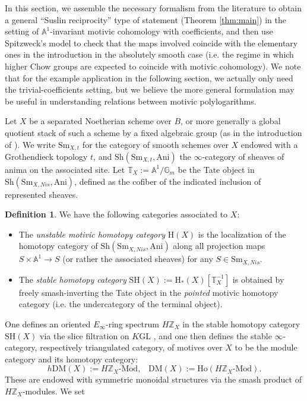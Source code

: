 \documentclass[a4paper,reqno,11pt]{amsart}
\theoremstyle{plain}
\theoremstyle{definition}
\newtheorem{definition}[theorem]{Definition}
\theoremstyle{remark}
\newcommand{\Sh}{{\mathrm{Sh}}}
\newcommand{\Sm}{{\mathrm{Sm}}}
\renewcommand{\H}{{\mathrm{H}}}
\newcommand{\Z}{\mathbb{Z}}
\newcommand{\A}{\mathbb{A}}
\newcommand{\G}{\mathbb{G}}
\newcommand{\T}{\mathbb{T}}
\newcommand{\DM}{\mathrm{DM}}
\newcommand{\SH}{\mathrm{SH}}
\newcommand{\GL}{\mathrm{GL}}
\begin{document}
In this section, we assemble the necessary formalism from the literature to obtain a general ``Suslin reciprocity'' type of statement (Theorem \ref{thm:main}) in the setting of $\A^1$-invariant motivic cohomology with coefficients, and then use Spitzweck's model to check that the maps involved coincide with the elementary ones in the introduction in the absolutely smooth case (i.e. the regime in which higher Chow groups are expected to coincide with motivic cohomology). We note that for the example application in the following section, we actually only need the trivial-coefficients setting, but we believe the more general formulation may be useful in understanding relations between motivic polylogarithms.

Let $X$ be a separated Noetherian scheme over $B$, or more generally a global quotient stack of such a scheme by a fixed algebraic group (as in the introduction of \cite{Hoy}). We write $\Sm_{X,t}$ for the category of smooth schemes over $X$ endowed with a Grothendieck topology $t$, and $\Sh(\Sm_{X,t}, \mathrm{Ani})$ the $\infty$-category of sheaves of anima on the associated site. Let $\T_X := \A^1 / \G_m$ be the Tate object in $\Sh(\Sm_{X,Nis}, \mathrm{Ani})$, defined as the cofiber of the indicated inclusion of represented sheaves.
\begin{definition}
We have the following categories associated to $X$:
\begin{itemize}
    \item The \emph{unstable motivic homotopy category} $\H(X)$ is the localization of the homotopy category of $\Sh(\Sm_{X,Nis}, \mathrm{Ani})$ along all projection maps $S\times \A^1 \to S$ (or rather the associated sheaves) for any $S\in \Sm_{X,Nis}$. 
    \item The \emph{stable homotopy category} $\SH(X):= \H_*(X)[\T_X^{-1}]$ is obtained by freely smash-inverting the Tate object in the \emph{pointed} motivic homotopy category (i.e. the undercategory of the terminal object).
\end{itemize}
\end{definition}
One defines an oriented $E_\infty$-ring spectrum $H\Z_X$ in the stable homotopy category $\SH(X)$ via the slice filtration on $K\GL$ \cite{BEM}, and one then defines the stable $\infty$-category, respectively triangulated category, of motives over $X$ to be the module category and its homotopy category:
\[
h\DM(X):= H\Z_X\text{-}\mathrm{Mod},\;\;\;\DM(X) := \mathrm{Ho}(H\Z_X\text{-}\mathrm{Mod}).
\]
These are endowed with symmetric monoidal structures via the smash product of $H\Z_X$-modules. We set
\end{document}
